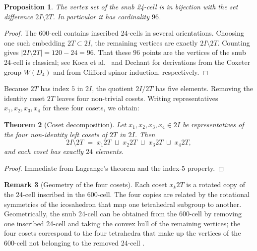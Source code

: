 \documentclass[10pt,reqno]{amsart}
\theoremstyle{plain}
\newtheorem{theorem}{Theorem}[section]
\newtheorem{proposition}[theorem]{Proposition}
\theoremstyle{definition}
\newtheorem{remark}[theorem]{Remark}
\begin{document}
\begin{proposition}\label{prop:96}
The vertex set of the snub 24-cell is in bijection with the set difference $2I \setminus 2T$. In particular it has cardinality $96$.
\end{proposition}

\begin{proof}
The 600-cell contains inscribed 24-cells in several orientations. Choosing one such embedding $2T \subset 2I$, the remaining vertices are exactly $2I \setminus 2T$. Counting gives $|2I \setminus 2T| = 120 - 24 = 96$. That these $96$ points are the vertices of the snub 24-cell is classical; see Koca et al.~\cite{Koca2011} and Dechant \cite{Dechant2021} for derivations from the Coxeter group $W(D_4)$ and from Clifford spinor induction, respectively.
\end{proof}

Because $2T$ has index $5$ in $2I$, the quotient $2I/2T$ has five elements. Removing the identity coset $2T$ leaves four non-trivial cosets. Writing representatives $x_1, x_2, x_3, x_4$ for these four cosets, we obtain:

\begin{theorem}[Coset decomposition]\label{thm:cosets}
Let $x_1, x_2, x_3, x_4 \in 2I$ be representatives of the four non-identity left cosets of $2T$ in $2I$. Then
\begin{equation}\label{eq:coset-decomp}
2I \setminus 2T \;=\; x_1 2T \;\sqcup\; x_2 2T \;\sqcup\; x_3 2T \;\sqcup\; x_4 2T,
\end{equation}
and each coset has exactly $24$ elements.
\end{theorem}

\begin{proof}
Immediate from Lagrange's theorem and the index-$5$ property.
\end{proof}

\begin{remark}[Geometry of the four cosets]
Each coset $x_k 2T$ is a rotated copy of the 24-cell inscribed in the 600-cell. The four copies are related by the rotational symmetries of the icosahedron that map one tetrahedral subgroup to another. Geometrically, the snub 24-cell can be obtained from the 600-cell by removing one inscribed 24-cell and taking the convex hull of the remaining vertices; the four cosets correspond to the four tetrahedra that make up the vertices of the 600-cell not belonging to the removed 24-cell \cite{SadocMosseri1989,Onoda1987}.
\end{remark}
\end{document}

